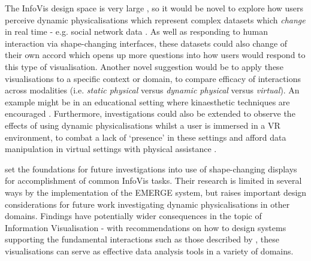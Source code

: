 \documentclass[11pt]{article}
\begin{document}
The InfoVis design space is very large \citep{card1997}, so it would be novel to explore how users perceive dynamic physicalisations which represent complex datasets which \textit{change} in real time - e.g. social network data \citep{federico2011}. As well as responding to human interaction via shape-changing interfaces, these datasets could also change of their own accord which opens up more questions into how users would respond to this type of visualisation. Another novel suggestion would be to apply these visualisations to a specific context or domain, to compare efficacy of interactions across modalities (i.e. \textit{static physical} versus \textit{dynamic physical} versus \textit{virtual}). An example might be in an educational setting where kinaesthetic techniques are encouraged \citep{gilakjani2011}. Furthermore, investigations could also be extended to observe the effects of using dynamic physicalisations whilst a user is immersed in a VR environment, to combat a lack of `presence' in these settings and afford data manipulation in virtual settings with physical assistance \citep{tennent2017}.

\citet{taher2015} set the foundations for future investigations into use of shape-changing displays for accomplishment of common InfoVis tasks. Their research is limited in several ways by the implementation of the EMERGE system, but raises important design considerations for future work investigating dynamic physicalisations in other domains. Findings have potentially wider consequences in the topic of Information Visualisation - with recommendations on how to design systems supporting the fundamental interactions such as those described by \citet{heer2012}, these visualisations can serve as effective data analysis tools in a variety of domains.


\newpage
\small

\normalsize
\end{document}
